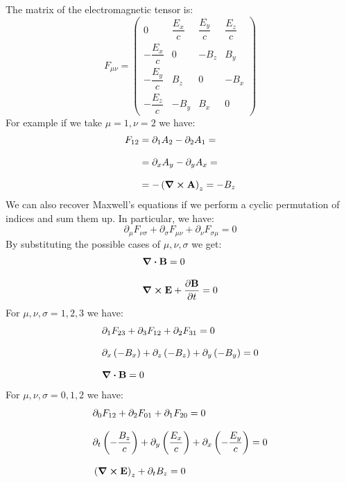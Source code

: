 The matrix of the electromagnetic tensor is:
\begin{equation}
  F_{\mu\nu} =
  \begin{pmatrix}
  0 & \dfrac{E_x}{c} & \dfrac{E_y}{c} & \dfrac{E_z}{c} \\[8pt]
  -\dfrac{E_x}{c} & 0 & -B_z & B_y \\[8pt]
  -\dfrac{E_y}{c} & B_z & 0 & -B_x \\[8pt]
  -\dfrac{E_z}{c} & -B_y & B_x & 0
  \end{pmatrix}
\end{equation}
For example if we take $\mu = 1, \nu = 2$ we have:
\begin{equation}
  \begin{split}
    F_{12} &= \partial_{1}A_{2} - \partial_{2}A_{1} =\\[8pt]
    &= \partial_{x}A_{y} - \partial_{y}A_{x} =\\[8pt]
    &= -\left(\curl{\vb{A}}\right)_z = -B_z
  \end{split}
\end{equation}
We can also recover Maxwell's equations if we perform a cyclic permutation of indices and sum them up. In particular, we have:
\begin{equation}
  \boxed{\partial_{\mu}F_{\nu \sigma} + \partial_{\sigma}F_{\mu \nu} + \partial_{\nu}F_{\sigma \mu} = 0}
\end{equation}
By substituting the possible cases of $\mu,\nu,\sigma$ we get:
\begin{equation}
  \begin{split}
    &\div{\vec{B}} = 0 \\[8pt]
    &\curl{\vec{E}} + \pdv{\vec{B}}{t} = 0
  \end{split}
\end{equation}
For $\mu,\nu,\sigma = 1,2,3$ we have:
\begin{equation}
  \begin{split}
    &\partial_{1}F_{2 3} + \partial_{3}F_{1 2} + \partial_{2}F_{3 1} = 0 \\[8pt]
    &\partial_{x}\left(-B_x\right) + \partial_{z}\left(-B_z\right) + \partial_{y}\left(-B_y\right) = 0 \\[8pt]
    &\div{\vb{B}} = 0
  \end{split}
\end{equation}
For $\mu,\nu,\sigma = 0,1,2$ we have:
\begin{equation}
  \begin{split}
    &\partial_{0}F_{1 2} + \partial_{2}F_{0 1} + \partial_{1}F_{2 0} = 0 \\[8pt]
    &\partial_{t}\left(-\dfrac{B_z}{c}\right) + \partial_{y}\left(\dfrac{E_x}{c}\right) + \partial_{x}\left(-\dfrac{E_y}{c}\right) = 0 \\[8pt]
    &\left(\curl{\vb{E}}\right)_z + \partial_t B_z = 0
  \end{split}
\end{equation}
